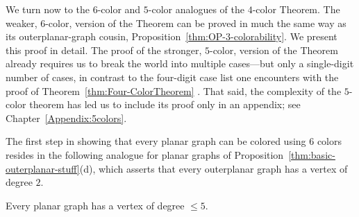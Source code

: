 We turn now to the $6$-color and $5$-color analogues of the $4$-color
Theorem.  The weaker, $6$-color, version of the Theorem can be proved
in much the same way as its outerplanar-graph cousin,
Proposition~\ref{thm:OP-3-colorability}.  We present this proof in detail.
The proof of the stronger, $5$-color, version of the Theorem already requires us to break the
world into multiple cases---but only a single-digit number of cases,
in contrast to the four-digit case list one encounters with the proof
of Theorem~\ref{thm:Four-ColorTheorem} \cite{AppelH77a,AppelH77b}.  That said,
the complexity of the $5$-color theorem has led us to include its proof only in an appendix; see
Chapter~\ref{Appendix:5colors}.


\bigskip

The first step in showing that every planar graph can be colored using
$6$ colors resides in the following analogue for planar graphs of
Proposition~\ref{thm:basic-outerplanar-stuff}(d), which asserts that
every outerplanar graph has a vertex of degree $2$.

\begin{lemma}
\label{thm:PlanarGraph-degree5}
Every planar graph has a vertex of degree $\leq 5$.
\end{lemma}

